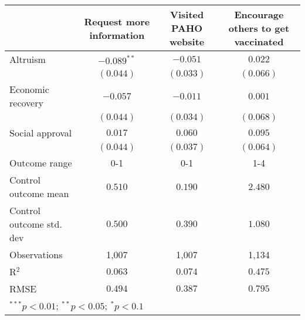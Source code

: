 \begin{table}
\begin{center}
\begin{tabular}{l c c c}
\hline
 & Request more information & Visited PAHO website & Encourage others to get vaccinated \\
\hline
Altruism                 & $-0.089^{**}$ & $-0.051$  & $0.022$   \\
                         & $(0.044)$     & $(0.033)$ & $(0.066)$ \\
Economic recovery        & $-0.057$      & $-0.011$  & $0.001$   \\
                         & $(0.044)$     & $(0.034)$ & $(0.068)$ \\
Social approval          & $0.017$       & $0.060$   & $0.095$   \\
                         & $(0.044)$     & $(0.037)$ & $(0.064)$ \\
\hline
Outcome range            & 0-1           & 0-1       & 1-4       \\
Control outcome mean     & $0.510$       & $0.190$   & $2.480$   \\
Control outcome std. dev & $0.500$       & $0.390$   & $1.080$   \\
Observations             & 1,007         & 1,007     & 1,134     \\
R$^{2}$                  & $0.063$       & $0.074$   & $0.475$   \\
RMSE                     & $0.494$       & $0.387$   & $0.795$   \\
\hline
\multicolumn{4}{l}{\scriptsize{$^{***}p<0.01$; $^{**}p<0.05$; $^{*}p<0.1$}}
\end{tabular}
\caption{}
\label{table:Tables and Figures/SI_table23_motiv_Brazil_behav}
\end{center}
\end{table}
